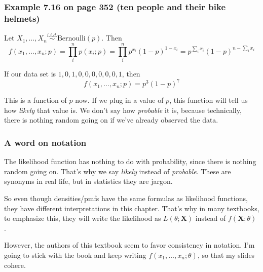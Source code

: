 \documentclass{beamer}
\begin{document}
\begin{frame}
\frametitle{Example 7.16 on page 352 (ten people and their bike helmets)}

Let $X_1, \ldots, X_n \overset{i.i.d.}{\sim} \text{Bernoulli}(p)$. Then
\[
f(x_1, \ldots, x_n; p) = \prod_i^n p(x_i;p) = \prod_i^n p^{x_i}(1-p)^{1 - x_i} = p^{\sum_i x_i}(1-p)^{n - \sum_i x_i}
\]

If our data set is $1, 0, 1, 0, 0, 0, 0, 0, 0, 1$, then 
\[
f(x_1, \ldots, x_n; p) = p^3(1-p)^7
\]

This is a function of $p$ now. If we plug in a value of $p$, this function will tell us how \emph{likely} that value is. We don't say how \emph{probable} it is, because technically, there is nothing random going on if we've already observed the data. 
\end{frame}


\begin{frame}
\frametitle{A word on notation}

The likelihood function has nothing to do with probability, since there is nothing random going on. That's why we say \emph{likely} instead of \emph{probable}. These are synonyms in real life, but in statistics they are jargon. 
\newline

So even though densities/pmfs have the same formulas as likelihood functions, they have different interpretations in this chapter. That's why in many textbooks, to emphasize this, they will write the likelihood as $L(\theta ; \mathbf{X})$ instead of $f(\mathbf{X}; \theta)$ . 
\newline

However, the authors of this textbook seem to favor consistency in notation. I'm going to stick with the book and keep writing $f(x_1, \ldots, x_n; \theta)$, so that my slides cohere. 


\end{frame}
\end{document}
